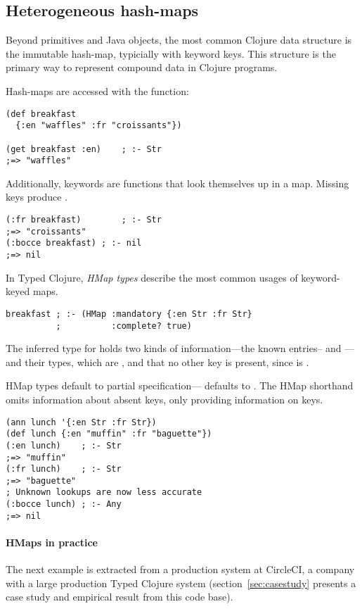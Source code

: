 \subsection{Heterogeneous hash-maps}

Beyond primitives and Java objects, the most common Clojure data
structure is the 
immutable hash-map, typicially with keyword keys. This structure is
the primary way to represent compound data in Clojure programs.

Hash-maps are accessed with the  function:
\begin{exmp}
\begin{verbatim}
(def breakfast 
  {:en "waffles" :fr "croissants"})

(get breakfast :en)    ; :- Str
;=> "waffles"
\end{verbatim}
\label{example:breakfastcomplete}
\end{exmp}
Additionally, keywords are functions that look themselves up in a
map. Missing keys produce .
\begin{verbatim}
(:fr breakfast)        ; :- Str
;=> "croissants"
(:bocce breakfast) ; :- nil
;=> nil
\end{verbatim}

In Typed Clojure, \emph{HMap types} describe the most common usages of
keyword-keyed maps.
\begin{verbatim}
breakfast ; :- (HMap :mandatory {:en Str :fr Str}
          ;          :complete? true)
\end{verbatim}
The inferred type for  holds two kinds of information---the known entries--
and ---and their types, which are  , and that 
no other key is present, since  is .

HMap types default to  partial specification--- defaults to . The HMap shorthand 
omits
information about absent keys, only providing information on
 keys.
%
\begin{exmp}
\begin{verbatim}
(ann lunch '{:en Str :fr Str})
(def lunch {:en "muffin" :fr "baguette"})
(:en lunch)    ; :- Str
;=> "muffin"
(:fr lunch)    ; :- Str
;=> "baguette"
; Unknown lookups are now less accurate
(:bocce lunch) ; :- Any
;=> nil
\end{verbatim}
\label{example:lunchpartial}
\end{exmp}

\paragraph{HMaps in practice} The next example is extracted from a production system at CircleCI,
a company with a large production Typed Clojure system
(section~\ref{sec:casestudy} presents a case study and empirical
result from this code base).

